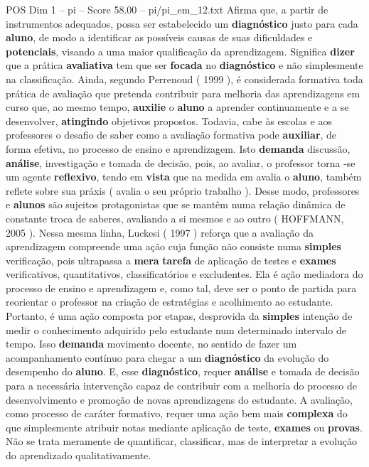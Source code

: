 \begin{textsample}{POS Dim 1 – pi – Score 58.00 – pi/pi\_em\_12.txt}
Afirma que, a partir de instrumentos adequados, possa ser estabelecido um \textbf{diagnóstico} justo para cada \textbf{aluno}, de modo a identificar as possíveis causas de suas dificuldades e \textbf{potenciais}, visando a uma maior qualificação da aprendizagem.
Significa \textbf{dizer} que a prática \textbf{avaliativa} tem que ser \textbf{focada} no \textbf{diagnóstico} e não simplesmente na classificação.
Ainda, segundo Perrenoud ( 1999 ), é considerada formativa toda prática de avaliação que pretenda contribuir para melhoria das aprendizagens em curso que, ao mesmo tempo, \textbf{auxilie} o \textbf{aluno} a aprender continuamente e a se desenvolver, \textbf{atingindo} objetivos propostos.
Todavia, cabe às escolas e aos professores o desafio de saber como a avaliação formativa pode \textbf{auxiliar}, de forma efetiva, no processo de ensino e aprendizagem.
Isto \textbf{demanda} discussão, \textbf{análise}, investigação e tomada de decisão, pois, ao avaliar, o professor torna -se um agente \textbf{reflexivo}, tendo em \textbf{vista} que na medida em avalia o \textbf{aluno}, também reflete sobre sua práxis ( avalia o seu próprio trabalho ).
Desse modo, professores e \textbf{alunos} são sujeitos protagonistas que se mantêm numa relação dinâmica de constante troca de saberes, avaliando a si mesmos e ao outro ( HOFFMANN, 2005 ).
Nessa mesma linha, Luckesi ( 1997 ) reforça que a avaliação da aprendizagem compreende uma ação cuja função não consiste numa \textbf{simples} verificação, pois ultrapassa a \textbf{mera} \textbf{tarefa} de aplicação de testes e \textbf{exames} verificativos, quantitativos, classificatórios e excludentes.
Ela é ação mediadora do processo de ensino e aprendizagem e, como tal, deve ser o ponto de partida para reorientar o professor na criação de estratégias e acolhimento ao estudante.
Portanto, é uma ação composta por etapas, desprovida da \textbf{simples} intenção de medir o conhecimento adquirido pelo estudante num determinado intervalo de tempo.
Isso \textbf{demanda} movimento docente, no sentido de fazer um acompanhamento contínuo para chegar a um \textbf{diagnóstico} da evolução do desempenho do \textbf{aluno}.
E, esse \textbf{diagnóstico}, requer \textbf{análise} e tomada de decisão para a necessária intervenção capaz de contribuir com a melhoria do processo de desenvolvimento e promoção de novas aprendizagens do estudante.
A avaliação, como processo de caráter formativo, requer uma ação bem mais \textbf{complexa} do que simplesmente atribuir notas mediante aplicação de teste, \textbf{exames} ou \textbf{provas}.
Não se trata meramente de quantificar, classificar, mas de interpretar a evolução do aprendizado qualitativamente.

\end{textsample}
